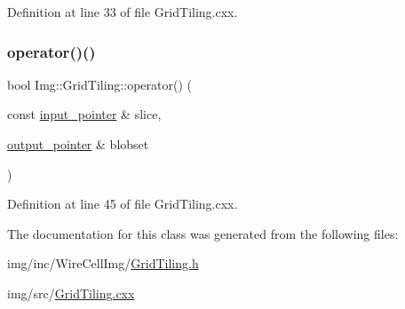 Definition at line 33 of file Grid\+Tiling.\+cxx.

\mbox{\label{class_wire_cell_1_1_img_1_1_grid_tiling_ad1b3636679572ca647161f331252356c}} 
\subsubsection{\texorpdfstring{operator()()}{operator()()}}
{\footnotesize\ttfamily bool Img\+::\+Grid\+Tiling\+::operator() (\begin{DoxyParamCaption}\item[{const \hyperlink{class_wire_cell_1_1_i_function_node_a55c0946156df9b712b8ad1a0b59b2db6}{input\+\_\+pointer} \&}]{slice,  }\item[{\hyperlink{class_wire_cell_1_1_i_function_node_afc02f1ec60d31aacddf64963f9ca650b}{output\+\_\+pointer} \&}]{blobset }\end{DoxyParamCaption})\hspace{0.3cm}{\ttfamily [virtual]}}



Definition at line 45 of file Grid\+Tiling.\+cxx.



The documentation for this class was generated from the following files\+:\begin{DoxyCompactItemize}
\item 
img/inc/\+Wire\+Cell\+Img/\hyperlink{_grid_tiling_8h}{Grid\+Tiling.\+h}\item 
img/src/\hyperlink{_grid_tiling_8cxx}{Grid\+Tiling.\+cxx}\end{DoxyCompactItemize}
